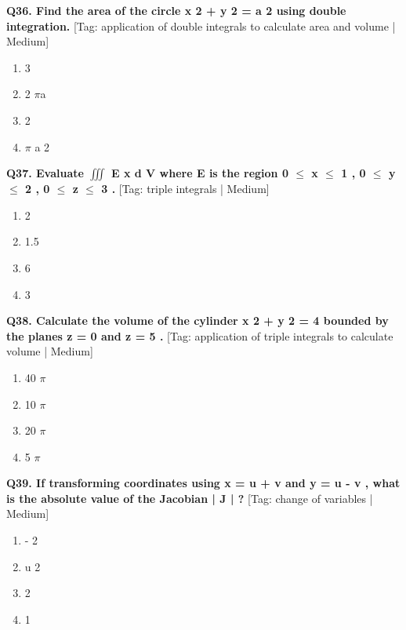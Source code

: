 \noindent\textbf{Q36. Find the area of the circle x 2 + y 2 = a 2 using double integration.} \hfill [Tag: application of double integrals to calculate area and volume | Medium]
\begin{enumerate}[label=(\alph*),topsep=2pt,itemsep=1pt,partopsep=0pt,parsep=0pt]
    \item {{3}}
    \item {{2 $\pi$a}}
    \item {{2}}
    \item {{$\pi$ a 2}}
\end{enumerate}
\vspace{2mm}

\noindent\textbf{Q37. Evaluate $\iiint$ E x d V where E is the region 0 $\le$ x $\le$ 1 , 0 $\le$ y $\le$ 2 , 0 $\le$ z $\le$ 3 .} \hfill [Tag: triple integrals | Medium]
\begin{enumerate}[label=(\alph*),topsep=2pt,itemsep=1pt,partopsep=0pt,parsep=0pt]
    \item {{2}}
    \item {{1.5}}
    \item {{6}}
    \item {{3}}
\end{enumerate}
\vspace{2mm}

\noindent\textbf{Q38. Calculate the volume of the cylinder x 2 + y 2 = 4 bounded by the planes z = 0 and z = 5 .} \hfill [Tag: application of triple integrals to calculate volume | Medium]
\begin{enumerate}[label=(\alph*),topsep=2pt,itemsep=1pt,partopsep=0pt,parsep=0pt]
    \item {{40 $\pi$}}
    \item {{10 $\pi$}}
    \item {{20 $\pi$}}
    \item {{5 $\pi$}}
\end{enumerate}
\vspace{2mm}

\noindent\textbf{Q39. If transforming coordinates using x = u + v and y = u - v , what is the absolute value of the Jacobian | J | ?} \hfill [Tag: change of variables | Medium]
\begin{enumerate}[label=(\alph*),topsep=2pt,itemsep=1pt,partopsep=0pt,parsep=0pt]
    \item {{- 2}}
    \item {{u 2}}
    \item {{2}}
    \item {{1}}
\end{enumerate}
\vspace{2mm}

